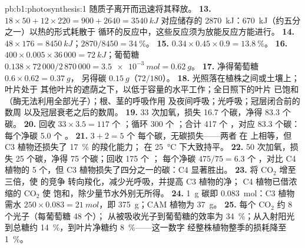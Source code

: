 \begin{solution}{pb:b1:photosynthesis:1}
随质子离开而迅速将其释放。
\textbf{13.} $18\times 50 + 12\times 220 = 900 + 2640 = \qty{3540}{kJ}$
对应储存的 \qty{2870}{kJ}：\qty{670}{kJ}（约五分之一）以热的形式耗散于
循环的反应中，这些反应须为放能反应方能进行。
\textbf{14.} $48\times 176 = \qty{8450}{kJ}$；$2870/8450 = \qty{34}{\%}$。
\textbf{15.} $0.34\times 0.45\times 0.9 = \qty{13.8}{\%}$。
\textbf{16.} $400\times 0.005\times 36\,000 = \qty{72}{kJ}$；葡萄糖
$0.138\times 72\,000/2\,870\,000 = \qty{3.5e-3}{mol} = \qty{0.62}{g}$。
\textbf{17.} 净得葡萄糖 $0.6\times 0.62 = \qty{0.37}{g}$，
另得碳 $\qty{0.15}{g}$（$72/180$）。
\textbf{18.} 光照落在植株之间或土壤上；叶片处于
其他叶片的遮荫之下，以低于容量的水平工作；全日照下的叶片
已饱和（酶无法利用全部光子）；根、茎的呼吸作用
及夜间呼吸；光呼吸；冠层闭合前的数周
以及冠层衰老之后的数周。
\textbf{19.} 33 次加氧，损失 16.7 个碳，净得 83.3 个碳。
\textbf{20.} 回收 $33\times 3.5 = 117$ 个 ；循环 300 个 ；合计
417 个 ，对应 83.3 个碳：每个净碳 5.0 个 。
\textbf{21.} $3 + 2 = 5$ 个  每个碳，无碳损失——两者
在  上相等，但 C3 植物还损失了 \qty{17}{\%} 的羧化能力；
在 \qty{25}{\celsius} 下大致持平。
\textbf{22.} 50 次加氧，损失 25 个碳，净得 75 个碳；回收 175 个 ；
每个净碳 $475/75 = 6.3$ 个 ，对比 C4 植物的 5 个，但
C3 植物损失了四分之一的碳：C4 显著胜出。
\textbf{23.} 将 $\mathrm{CO_2}$ 增至三倍，使  的竞争
转向羧化，减少光呼吸，并提高 C3 植物的净；
C4 植物已借浓缩的
$\mathrm{CO_2}$ 使  饱和，除少量节水外别无所得。
\textbf{24.} \qty{1}{g} 碳即 \qty{0.083}{mol}：C3 植物需水 $250\times 0.083 = \qty{21}{mol}$，即 \qty{375}{g}；CAM 植物为 \qty{37}{g}。
\textbf{25.} 每个 $\mathrm{CO_2}$ 约 8 个光子（每葡萄糖 48 个）；
从被吸收光子到葡萄糖的效率为 \qty{34}{\%}；从入射阳光到总糖约
\qty{14}{\%}，到叶片净糖约 \qty{8}{\%}——这一数字
经整株植物整季的损耗降至
\qty{1}{\%}。
\end{solution}
